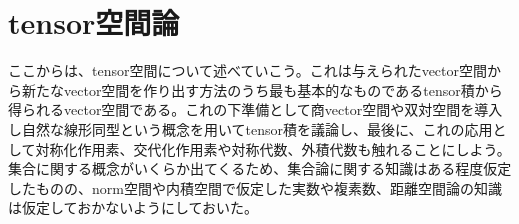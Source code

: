 \documentclass[a4paper]{jsarticle}
\begin{document}
\section{tensor空間論}
ここからは、tensor空間について述べていこう。これは与えられたvector空間から新たなvector空間を作り出す方法のうち最も基本的なものであるtensor積から得られるvector空間である。これの下準備として商vector空間や双対空間を導入し自然な線形同型という概念を用いてtensor積を議論し、最後に、これの応用として対称化作用素、交代化作用素や対称代数、外積代数も触れることにしよう。集合に関する概念がいくらか出てくるため、集合論に関する知識はある程度仮定したものの、norm空間や内積空間で仮定した実数や複素数、距離空間論の知識は仮定しておかないようにしておいた。
\end{document}

